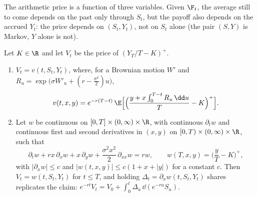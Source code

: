 The arithmetic price is a function of three variables. Given $\F_t$, the average still to come
depends on the past only through $S_t$, but the payoff also depends on the accrued $Y_t$: the price
depends on $(S_t,Y_t)$, not on $S_t$ alone (the pair $(S,Y)$ is Markov, $Y$ alone is not).

\begin{proposition}\label{prop:exo-asian-pde}
Let $K\in\R$ and let $V_t$ be the price of $(Y_T/T-K)^+$.
\begin{enumerate}[label=(\roman*)]
  \item $V_t=v(t,S_t,Y_t)$, where, for a Brownian motion $W'$ and
    $R_u=\exp\big(\sigma W'_u+(r-\frac{\sigma^2}2)u\big)$,
    \[
      v(t,x,y)=e^{-r(T-t)}\,\E\Big[\Big(\frac{y+x\int_0^{T-t}R_u\,\dd u}{T}-K\Big)^+\Big].
    \]
  \item Let $w$ be continuous on $[0,T]\times(0,\infty)\times\R$, with continuous $\partial_tw$ and
    continuous first and second derivatives in $(x,y)$ on $[0,T)\times(0,\infty)\times\R$, such that
    \begin{equation}\label{eq:exo-asian-pde}
      \partial_tw+rx\,\partial_xw+x\,\partial_yw+\frac{\sigma^2x^2}2\,\partial_{xx}w=rw,\qquad
      w(T,x,y)=\Big(\frac yT-K\Big)^+,
    \end{equation}
    with $|\partial_xw|\le c$ and $|w(t,x,y)|\le c(1+x+|y|)$ for a constant $c$. Then
    $V_t=w(t,S_t,Y_t)$ for $t\le T$, and holding $\Delta_t=\partial_xw(t,S_t,Y_t)$ shares replicates
    the claim: $e^{-rt}V_t=V_0+\int_0^t\Delta_u\,\dd(e^{-ru}S_u)$.
\end{enumerate}
\end{proposition}

